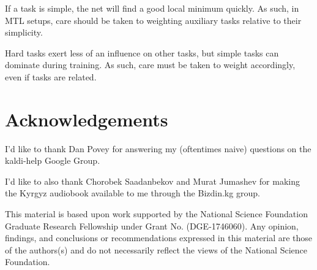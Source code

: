 \documentclass[a4paper]{article}
\begin{document}
If a task is simple, the net will find a good local minimum quickly. As such, in MTL setups, care should be taken to weighting auxiliary tasks relative to their simplicity.

Hard tasks exert less of an influence on other tasks, but simple tasks can dominate during training. As such, care must be taken to weight accordingly, even if tasks are related.




\section{Acknowledgements}

I'd like to thank Dan Povey for answering my (oftentimes naive) questions on the kaldi-help Google Group.

I'd like to also thank Chorobek Saadanbekov and Murat Jumashev for making the Kyrgyz audiobook available to me through the Bizdin.kg group.

This material is based upon work supported by the National Science Foundation Graduate Research Fellowship under Grant No. (DGE-1746060). Any opinion, findings, and conclusions or recommendations expressed in this material are those of the authors(s) and do not necessarily reflect the views of the National Science Foundation.

\newpage



\end{document}
